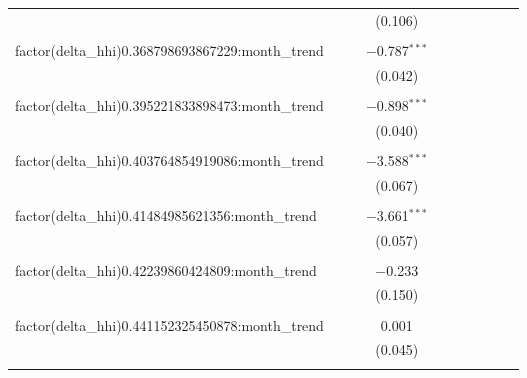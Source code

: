 \begin{table}[H]
{\begin{tabular}{@{\extracolsep{5pt}}lccccccccc}
   &  &  & (0.106) &  &  &  &  &  &  \\  

   & & & & & & & & & \\  

  factor(delta\_hhi)0.368798693867229:month\_trend &  &  & $-$0.787$^{***}$ &  &  &  &  &  &  \\  

   &  &  & (0.042) &  &  &  &  &  &  \\  

   & & & & & & & & & \\  

  factor(delta\_hhi)0.395221833898473:month\_trend &  &  & $-$0.898$^{***}$ &  &  &  &  &  &  \\  

   &  &  & (0.040) &  &  &  &  &  &  \\  

   & & & & & & & & & \\  

  factor(delta\_hhi)0.403764854919086:month\_trend &  &  & $-$3.588$^{***}$ &  &  &  &  &  &  \\  

   &  &  & (0.067) &  &  &  &  &  &  \\  

   & & & & & & & & & \\  

  factor(delta\_hhi)0.41484985621356:month\_trend &  &  & $-$3.661$^{***}$ &  &  &  &  &  &  \\  

   &  &  & (0.057) &  &  &  &  &  &  \\  

   & & & & & & & & & \\  

  factor(delta\_hhi)0.42239860424809:month\_trend &  &  & $-$0.233 &  &  &  &  &  &  \\  

   &  &  & (0.150) &  &  &  &  &  &  \\  

   & & & & & & & & & \\  

  factor(delta\_hhi)0.441152325450878:month\_trend &  &  & 0.001 &  &  &  &  &  &  \\  

   &  &  & (0.045) &  &  &  &  &  &  \\  

   & & & & & & & & & \\  


\end{tabular}}
\end{table}
